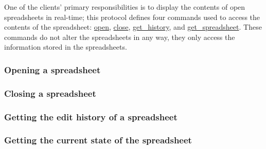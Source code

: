 One of the clients’ primary responsibilities is to display the contents of 
open spreadsheets in real-time; this protocol defines four commands used to 
access the contents of the spreadsheet: \hyperref[sec:message:open]{open}, 
\hyperref[sec:message:close]{close}, \hyperref[lst:command:get_history]{get\_history}, 
and \hyperref[lst:command:get_spreadsheet]{get\_spreadsheet}. These commands 
do not alter the spreadsheets in any way, they only access the information 
stored in the spreadsheets.

\subsubsection{Opening a spreadsheet}


\subsubsection{Closing a spreadsheet}


\subsubsection{Getting the edit history of a spreadsheet}


\subsubsection{Getting the current state of the spreadsheet}
